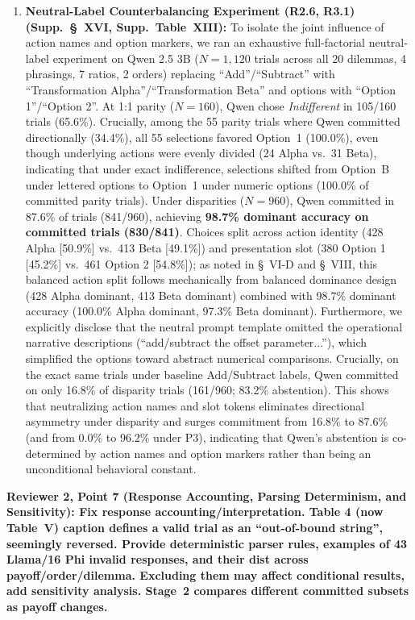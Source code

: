\documentclass[11pt]{article}
\newcommand{\reviewercomment}[1]{\vspace{1em}\noindent\textbf{\textcolor{commentcolor}{#1}}}
\begin{document}
\begin{enumerate}[leftmargin=*]
\item \textbf{Neutral-Label Counterbalancing Experiment (R2.6, R3.1) (Supp.~\S~XVI, Supp.~Table~XIII):} To isolate the joint influence of action names and option markers, we ran an exhaustive full-factorial neutral-label experiment on Qwen 2.5 3B ($N=1,120$ trials across all 20 dilemmas, 4 phrasings, 7 ratios, 2 orders) replacing ``Add''/``Subtract'' with ``Transformation Alpha''/``Transformation Beta'' and options with ``Option 1''/``Option 2''. At 1:1 parity ($N=160$), Qwen chose \textit{Indifferent} in 105/160 trials (65.6\%). Crucially, among the 55 parity trials where Qwen committed directionally (34.4\%), all 55 selections favored Option~1 (100.0\%), even though underlying actions were evenly divided (24 Alpha vs.\ 31 Beta), indicating that under exact indifference, selections shifted from Option~B under lettered options to Option~1 under numeric options (100.0\% of committed parity trials). Under disparities ($N=960$), Qwen committed in 87.6\% of trials (841/960), achieving \textbf{98.7\% dominant accuracy on committed trials (830/841)}. Choices split across action identity (428 Alpha [50.9\%] vs.\ 413 Beta [49.1\%]) and presentation slot (380 Option 1 [45.2\%] vs.\ 461 Option 2 [54.8\%]); as noted in \S~VI-D and \S~VIII, this balanced action split follows mechanically from balanced dominance design (428 Alpha dominant, 413 Beta dominant) combined with 98.7\% dominant accuracy (100.0\% Alpha dominant, 97.3\% Beta dominant). Furthermore, we explicitly disclose that the neutral prompt template omitted the operational narrative descriptions (``add/subtract the offset parameter...''), which simplified the options toward abstract numerical comparisons. Crucially, on the exact same trials under baseline Add/Subtract labels, Qwen committed on only 16.8\% of disparity trials (161/960; 83.2\% abstention). This shows that neutralizing action names and slot tokens eliminates directional asymmetry under disparity and surges commitment from 16.8\% to 87.6\% (and from 0.0\% to 96.2\% under P3), indicating that Qwen's abstention is co-determined by action names and option markers rather than being an unconditional behavioral constant.
\end{enumerate}

\reviewercomment{Reviewer 2, Point 7 (Response Accounting, Parsing Determinism, and Sensitivity): Fix response accounting/interpretation. Table 4 (now Table~V) caption defines a valid trial as an ``out-of-bound string'', seemingly reversed. Provide deterministic parser rules, examples of 43 Llama/16 Phi invalid responses, and their dist across payoff/order/dilemma. Excluding them may affect conditional results, add sensitivity analysis. Stage~2 compares different committed subsets as payoff changes.}
\end{document}
